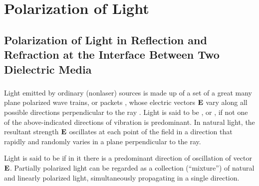 





\chapter{Polarization of Light}
\label{ch-35}

\section{Polarization of Light in Reflection and Refraction
at the Interface Between Two Dielectric Media}
\label{sec-35.1} 


\subsection{}\label{35.1.1} Light emitted by ordinary (nonlaser) sources is made up of a set of a great many plane polarized wave trains, or packets , whose electric vectors $\vb{E}$ vary along all possible directions perpendicular to the ray . Light is said to be
, or , if not one of the above-indicated directions of vibration is predominant. In natural light, the resultant strength $\vb{E}$ oscillates at each point of the field in a direction that rapidly and randomly varies in a plane perpendicular to the ray.

Light is said to be  if in it there is a predominant direction of oscillation of vector $\vb{E}$. Partially polarized light can be regarded as a collection (``mixture'') of natural and linearly polarized light, simultaneously propagating in a single direction.


